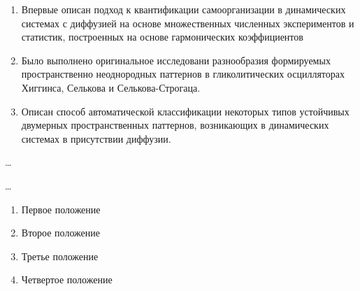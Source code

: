 {\novelty}
\begin{enumerate}[beginpenalty=10000] %
  \item Впервые описан подход к квантификации самоорганизации в динамических системах с диффузией на основе множественных численных экспериментов и статистик, построенных на основе гармонических коэффициентов
  \item Было выполнено оригинальное исследовани разнообразия формируемых пространственно неоднородных паттернов в гликолитических осцилляторах Хиггинса, Селькова и Селькова-Строгаца. 
  \item Описан способ автоматической классификации некоторых типов устойчивых двумерных пространственных паттернов, возникающих в динамических системах в присутствии диффузии.
\end{enumerate}

{\influence} \ldots

{\methods} \ldots

{}
\begin{enumerate}[beginpenalty=10000] %
  \item Первое положение
  \item Второе положение
  \item Третье положение
  \item Четвертое положение
\end{enumerate}

